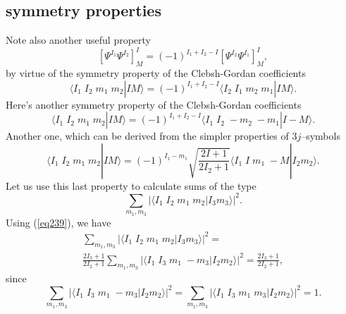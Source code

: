 \begin{subappendices}
\subsection{symmetry properties}
Note also another useful property
\begin{equation}
\left[ \Psi^{I_1}\Psi^{I_2}\right]^{I}_M=(-1)^{I_1+I_2-I}\left[ \Psi^{I_2}\Psi^{I_1}\right]^{I}_M,
\end{equation}
by virtue of the symmetry property of the Clebsh-Gordan coefficients
\begin{equation}\label{eq59}
\langle I_1\; I_2 \; m_1\;m_2 | I M\rangle= (-1)^{I_1+I_2-I} \langle I_2\; I_1 \; m_2\;m_1 | I M\rangle.
\end{equation}
Here's another symmetry property of the Clebsh-Gordan coefficients
\begin{equation}\label{eq28}
\langle I_1\; I_2 \; m_1\;m_2 | I M\rangle= (-1)^{I_1+I_2-I} \langle I_1\; I_2 \; -m_2\;-m_1 | I -M\rangle.
\end{equation}
Another one, which can be derived from the simpler properties of $3j$--symbols
\begin{equation}\label{eq239}
\langle I_1\; I_2 \; m_1\;m_2 | I M\rangle= (-1)^{I_1-m_1}\sqrt{\frac{2I+1}{2I_2+1}} \langle I_1\; I \; m_1\;-M | I_2 m_2\rangle.
\end{equation}
Let us use this last property to calculate sums of the type
\begin{equation}\label{eq240}
\sum_{m_1,m_3}\left|\langle I_1\; I_2 \; m_1\;m_2 | I_3 m_3\rangle \right|^2.
\end{equation}
Using (\ref{eq239}), we have
\begin{multline}\label{eq241}
\sum_{m_1,m_3}\left|\langle I_1\; I_2 \; m_1\;m_2 | I_3 m_3\rangle \right|^2=\\
\frac{2I_3+1}{2I_2+1}\sum_{m_1,m_3}\left|\langle I_1\; I_3 \; m_1\;-m_3 | I_2 m_2\rangle \right|^2=
\frac{2I_3+1}{2I_2+1},
\end{multline}
since
\begin{equation}\label{eq242}
\sum_{m_1,m_3}\left|\langle I_1\; I_3 \; m_1\;-m_3 | I_2 m_2\rangle \right|^2=\sum_{m_1,m_3}\left|\langle I_1\; I_3 \; m_1\;m_3 | I_2 m_2\rangle \right|^2=1.
\end{equation}

\end{subappendices}
